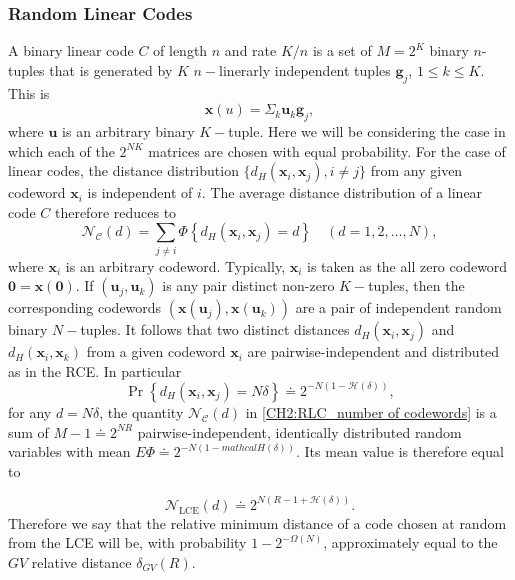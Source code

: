 \subsubsection{Random Linear Codes}
A binary linear code $C$ of length $n$ and rate $K/n$ is a set of $M=2^K$ binary $n$-tuples that is generated by $K$ $n-$linerarly independent tuples $\mathbf{g}_j$, $1\leq k \leq K$. This is
\begin{equation}
\mathbf{x}(u)=\Sigma_k \mathbf{u}_k \mathbf{g}_j,
\end{equation}
where $\mathbf{u}$ is an arbitrary binary $K-$tuple. Here we will be considering the case in which each of the $2^{NK}$ matrices are chosen with equal probability. For the case of linear codes, the distance distribution $\{d_H(\mathbf{x}_i,\mathbf{x}_j),i\neq j\}$ from any given codeword $\mathbf{x}_i$ is independent of $i$. The average distance distribution of a linear code $C$ therefore reduces to
\begin{equation}
\mathcal{N}_{\mathcal{C}}(d)=\sum_{j \neq i} \Phi\left\{d_{H}\left(\boldsymbol{x}_{i}, \boldsymbol{x}_{j}\right)=d\right\} \quad(d=1,2, \ldots, N),
\label{CH2:RLC_number of codewords}
\end{equation}
where $\mathbf{x}_i$ is an arbitrary codeword. Typically, $\mathbf{x}_i$ is taken as the all zero codeword $\mathbf{0}=\mathbf{x(0)}$. If $(\mathbf{u}_j,\mathbf{u}_k)$ is any pair distinct non-zero $K-$tuples, then the corresponding codewords $(\mathbf{x}(\mathbf{u}_j),\mathbf{x}(\mathbf{u}_k))$ are a pair of independent random binary $N-$tuples. It follows that two distinct distances $d_H(\mathbf{x}_i,\mathbf{x}_j)$ and $d_H(\mathbf{x}_i,\mathbf{x}_k)$ from a given codeword $\mathbf{x}_i$ are pairwise-independent and distributed as in the RCE. In particular 
\begin{equation}
\operatorname{Pr}\left\{d_{H}\left(\boldsymbol{x}_{i}, \boldsymbol{x}_{j}\right)=N \delta\right\} \doteq 2^{-N(1-\mathcal{H}(\delta))},
\end{equation}
for any $d=N\delta$, the quantity $\mathcal{N}_{\mathcal{C}}(d)$ in \eqref{CH2:RLC_number of codewords} is a sum of $M-1\doteq 2^{NR}$ pairwise-independent, identically distributed random variables with mean $E\Phi\doteq 2^{-N(1-mathcal{H}(\delta))}$. Its mean value is therefore equal to

\begin{equation}
\mathcal{N}_{\mathrm{LCE}}(d) \doteq 2^{N(R-1+\mathcal{H}(\delta))}.
\end{equation}
Therefore we say that the relative minimum distance of a code chosen at random from the LCE will be, with probability $1-2^{-\Omega(N)}$, approximately equal to the $GV$ relative distance $\delta_{GV}(R)$.\\

